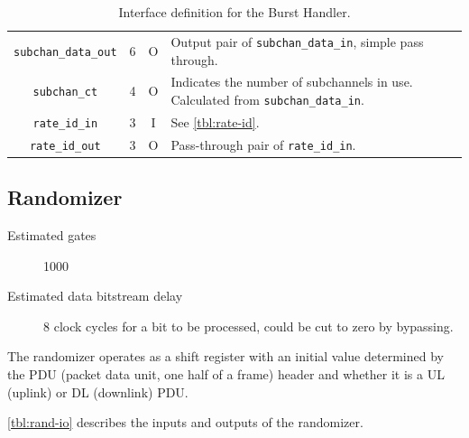 \documentclass[dvips,10pt,twocolumn]{article}
\newcommand{\wire}{\texttt}
\begin{document}
\begin{table}
\begin{tabularx}{\linewidth}{c|c|c|X}
	\wire{subchan\_data\_out} & 6 & O & Output pair of
	\wire{subchan\_data\_in}, simple pass through. \\

	\wire{subchan\_ct} & 4 & O & Indicates the number of subchannels in
	use. Calculated from \wire{subchan\_data\_in}. \\

	\wire{rate\_id\_in} & 3 & I  & See \autoref{tbl:rate-id}. \\

	\wire{rate\_id\_out} & 3 & O & Pass-through pair of
	\wire{rate\_id\_in}. \\

\end{tabularx}
\caption{Interface definition for the Burst Handler.}
\end{table}


\subsection{Randomizer}
\label{sec:rand}
\begin{description}
	\item[Estimated gates] 1000
	\item[Estimated data bitstream delay] 8 clock cycles for a bit to be
		processed, could be cut to zero by bypassing.
\end{description}

The randomizer operates as a shift register with an initial value
determined by the PDU (packet data unit, one half of a frame) header
and whether it is a UL (uplink) or DL (downlink) PDU.

\autoref{tbl:rand-io} describes the inputs and outputs of the
randomizer.
\end{document}
